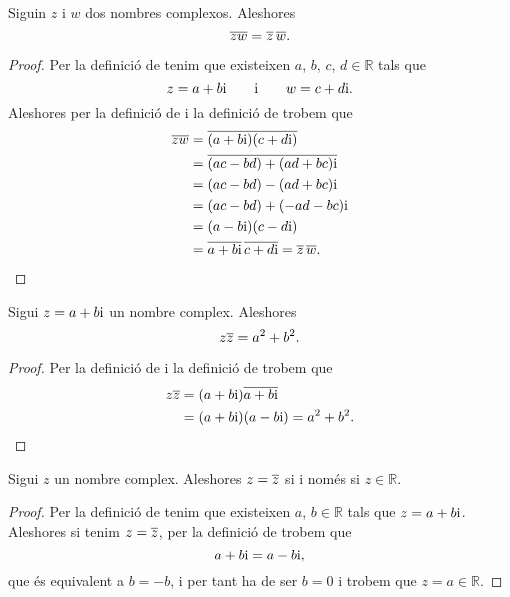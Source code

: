 \documentclass[../Apunts.tex]{subfiles}
\begin{document}
	\begin{proposition}
		\label{prop:el conjugat del producte és el producte de conjugats}
		Siguin \(z\) i \(w\) dos nombres complexos. Aleshores
		\[\overline{zw}=\overline{z}\,\overline{w}.\]
		\begin{proof}
			Per la definició de  tenim que existeixen \(a\), \(b\), \(c\), \(d\in\mathbb{R}\) tals que
			\[z=a+b\mathrm{i}\qquad\text{i}\qquad w=c+d\mathrm{i}.\]
			Aleshores per la definició de  i la definició de  trobem que
			\begin{align*}
				\overline{zw}&=\overline{(a+b\mathrm{i})(c+d\mathrm{i})} \\
				&=\overline{(ac-bd)+(ad+bc)\mathrm{i}} \\
				&=(ac-bd)-(ad+bc)\mathrm{i} \\
				&=(ac-bd)+(-ad-bc)\mathrm{i} \\
				&=(a-b\mathrm{i})(c-d\mathrm{i}) \\
				&=\overline{a+b\mathrm{i}}\,\overline{c+d\mathrm{i}}=\overline{z}\,\overline{w}\qedhere.
			\end{align*}
		\end{proof}
	\end{proposition}
	\begin{proposition}
		\label{prop:el producte d'un nombre complex pel seu conjugat és la suma dels quadrats de la seva part real i imaginaria}
		Sigui \(z=a+b\mathrm{i}\) un nombre complex. Aleshores
		\[z\overline{z}=a^{2}+b^{2}.\]
		\begin{proof}
			Per la definició de  i la definició de  trobem que
			\begin{align*}
				z\overline{z}&=(a+b\mathrm{i})\overline{a+b\mathrm{i}} \\
				&=(a+b\mathrm{i})(a-b\mathrm{i})=a^{2}+b^{2}.\qedhere
			\end{align*}
		\end{proof}
	\end{proposition}
	\begin{proposition}
		\label{prop:un nombre complex és igual al seu conjugat si i només si és un real}
		Sigui \(z\) un nombre complex. Aleshores \(z=\overline{z}\) si i només si \(z\in\mathbb{R}\).
		\begin{proof}
			Per la definició de  tenim que existeixen \(a\), \(b\in\mathbb{R}\) tals que \(z=a+b\mathrm{i}\). Aleshores si tenim \(z=\overline{z}\), per la definició de  trobem que
			\[a+b\mathrm{i}=a-b\mathrm{i},\]
			que és equivalent a \(b=-b\), i per tant ha de ser \(b=0\) i trobem que \(z=a\in\mathbb{R}\).
		\end{proof}
	\end{proposition}
\end{document}
